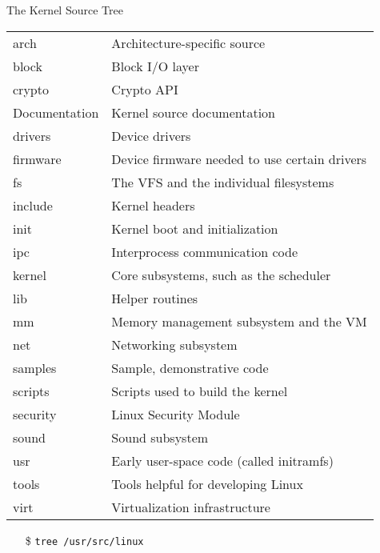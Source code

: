 \begin{frame}{The Kernel Source Tree}
  \begin{center}
    \begin{scriptsize}{\ttfamily
      \begin{tabular}{ll}
        arch& Architecture-specific source\\
        block& Block I/O layer\\
        crypto& Crypto API\\
        Documentation& Kernel source documentation\\
        drivers& Device drivers\\
        firmware& Device firmware needed to use certain drivers\\
        fs& The VFS and the individual filesystems\\
        include& Kernel headers\\
        init& Kernel boot and initialization\\
        ipc& Interprocess communication code\\
        kernel& Core subsystems, such as the scheduler\\
        lib& Helper routines\\
        mm& Memory management subsystem and the VM\\
        net& Networking subsystem\\
        samples& Sample, demonstrative code\\
        scripts& Scripts used to build the kernel\\
        security& Linux Security Module\\
        sound& Sound subsystem\\
        usr& Early user-space code (called initramfs)\\
        tools& Tools helpful for developing Linux\\
        virt& Virtualization infrastructure\\
      \end{tabular}}
    \end{scriptsize}
  \end{center}
  \begin{itemize}
    \item[\$] \texttt{tree /usr/src/linux}
  \end{itemize}
\end{frame}

